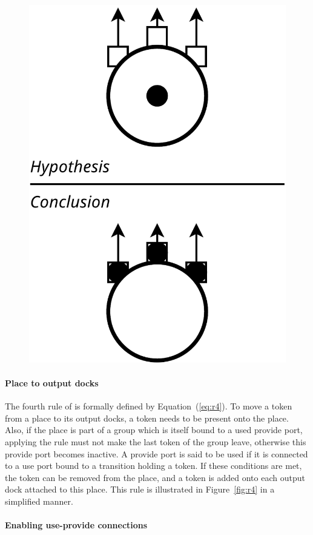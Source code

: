 {\begin{figure}[t]
\begin{minipage}[h]{0.45\columnwidth}
  \includegraphics[width=0.65\columnwidth]{./images/place_to_outputdocks.pdf}
\end{minipage}
\end{figure}

\paragraph{Place to output docks}{

The fourth rule of \mad is formally defined by
Equation~(\ref{eq:r4}). To move a token from a place to its output
docks, a token needs to be present onto the place. Also, if the place
is part of a group which is itself bound to a used provide port,
applying the rule must not make the last token of the group leave,
otherwise this provide port becomes inactive. A provide port is said
to be used if it is connected to a use port bound to a transition
holding a token.  If these conditions are met, the token can be
removed from the place, and a token is added onto each output dock
attached to this place. This rule is illustrated in
Figure~\ref{fig:r4} in a simplified manner.

}

\paragraph{Enabling use-provide connections}{

}}

